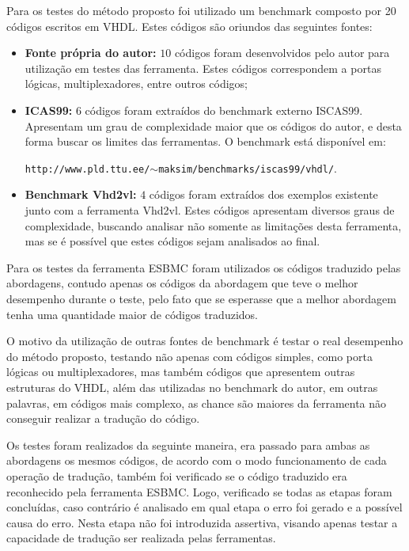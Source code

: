 \par 
Para os testes do método proposto foi utilizado um benchmark composto por 20 códigos escritos em VHDL. Estes códigos são oriundos das seguintes fontes: 

\begin{itemize} 
    \item \textbf{Fonte própria do autor:} $10$ códigos foram desenvolvidos pelo autor para utilização em testes das ferramenta. Estes códigos correspondem a portas lógicas, multiplexadores, entre outros códigos;  
    \item \textbf{ICAS99:} $6$ códigos foram extraídos do benchmark externo ISCAS99. Apresentam um grau de complexidade maior que os códigos do autor, e desta forma buscar os limites das ferramentas. O benchmark está disponível em:
    
    \texttt{http://www.pld.ttu.ee/$\sim$maksim/benchmarks/iscas99/vhdl/}.  
    
    \item \textbf{Benchmark Vhd2vl:} $4$ códigos foram extraídos dos exemplos existente junto com a ferramenta Vhd2vl. Estes códigos apresentam diversos graus de complexidade, buscando analisar não somente as limitações desta ferramenta, mas se é possível que estes códigos sejam analisados ao final. 
\end{itemize} 


\par 
Para os testes da ferramenta ESBMC foram utilizados os códigos traduzido pelas abordagens, contudo apenas os códigos da abordagem que teve o melhor desempenho durante o teste, pelo fato que se esperasse que a melhor abordagem tenha uma quantidade maior de códigos traduzidos. 

\par 
O motivo da utilização de outras fontes de benchmark é testar o real desempenho do método proposto, testando não apenas com códigos simples, como porta lógicas ou multiplexadores, mas também códigos que apresentem outras estruturas do VHDL, além das utilizadas no benchmark do autor, em outras palavras, em códigos mais complexo, as chance são maiores da ferramenta não conseguir realizar a tradução do código. 

\par 
Os testes foram realizados da seguinte maneira, era passado para ambas as abordagens os mesmos códigos, de acordo com o modo funcionamento de cada operação de tradução, também foi verificado se o código traduzido era reconhecido pela ferramenta ESBMC. Logo,  verificado se todas as etapas foram concluídas, caso contrário é analisado em qual etapa o erro foi gerado e a possível causa do erro. Nesta etapa não foi introduzida assertiva, visando apenas testar a capacidade de tradução ser realizada pelas ferramentas.  

